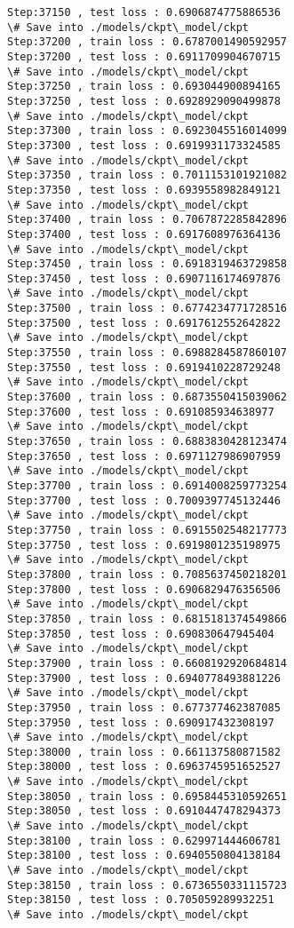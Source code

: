 \documentclass[11pt]{article}
\begin{document}
\begin{Verbatim}[commandchars=\\\{\}]
Step:37150 , test loss : 0.6906874775886536
\# Save into ./models/ckpt\_model/ckpt
Step:37200 , train loss : 0.6787001490592957
Step:37200 , test loss : 0.6911709904670715
\# Save into ./models/ckpt\_model/ckpt
Step:37250 , train loss : 0.693044900894165
Step:37250 , test loss : 0.6928929090499878
\# Save into ./models/ckpt\_model/ckpt
Step:37300 , train loss : 0.6923045516014099
Step:37300 , test loss : 0.6919931173324585
\# Save into ./models/ckpt\_model/ckpt
Step:37350 , train loss : 0.7011153101921082
Step:37350 , test loss : 0.6939558982849121
\# Save into ./models/ckpt\_model/ckpt
Step:37400 , train loss : 0.7067872285842896
Step:37400 , test loss : 0.6917608976364136
\# Save into ./models/ckpt\_model/ckpt
Step:37450 , train loss : 0.6918319463729858
Step:37450 , test loss : 0.6907116174697876
\# Save into ./models/ckpt\_model/ckpt
Step:37500 , train loss : 0.6774234771728516
Step:37500 , test loss : 0.6917612552642822
\# Save into ./models/ckpt\_model/ckpt
Step:37550 , train loss : 0.6988284587860107
Step:37550 , test loss : 0.6919410228729248
\# Save into ./models/ckpt\_model/ckpt
Step:37600 , train loss : 0.6873550415039062
Step:37600 , test loss : 0.691085934638977
\# Save into ./models/ckpt\_model/ckpt
Step:37650 , train loss : 0.6883830428123474
Step:37650 , test loss : 0.6971127986907959
\# Save into ./models/ckpt\_model/ckpt
Step:37700 , train loss : 0.6914008259773254
Step:37700 , test loss : 0.7009397745132446
\# Save into ./models/ckpt\_model/ckpt
Step:37750 , train loss : 0.6915502548217773
Step:37750 , test loss : 0.6919801235198975
\# Save into ./models/ckpt\_model/ckpt
Step:37800 , train loss : 0.7085637450218201
Step:37800 , test loss : 0.6906829476356506
\# Save into ./models/ckpt\_model/ckpt
Step:37850 , train loss : 0.6815181374549866
Step:37850 , test loss : 0.690830647945404
\# Save into ./models/ckpt\_model/ckpt
Step:37900 , train loss : 0.6608192920684814
Step:37900 , test loss : 0.6940778493881226
\# Save into ./models/ckpt\_model/ckpt
Step:37950 , train loss : 0.677377462387085
Step:37950 , test loss : 0.690917432308197
\# Save into ./models/ckpt\_model/ckpt
Step:38000 , train loss : 0.661137580871582
Step:38000 , test loss : 0.6963745951652527
\# Save into ./models/ckpt\_model/ckpt
Step:38050 , train loss : 0.6958445310592651
Step:38050 , test loss : 0.6910447478294373
\# Save into ./models/ckpt\_model/ckpt
Step:38100 , train loss : 0.629971444606781
Step:38100 , test loss : 0.6940550804138184
\# Save into ./models/ckpt\_model/ckpt
Step:38150 , train loss : 0.6736550331115723
Step:38150 , test loss : 0.705059289932251
\# Save into ./models/ckpt\_model/ckpt

\end{Verbatim}
\end{document}

